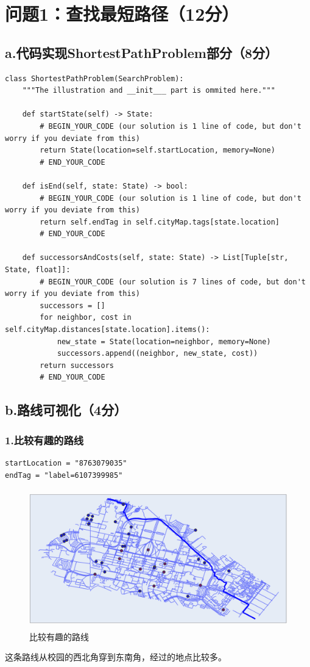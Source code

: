 \documentclass{article}
\begin{document}
\section*{问题1：查找最短路径（12分）}
\subsection*{a.代码实现ShortestPathProblem部分（8分）}
\begin{lstlisting}
class ShortestPathProblem(SearchProblem):
    """The illustration and __init___ part is ommited here."""

    def startState(self) -> State:
        # BEGIN_YOUR_CODE (our solution is 1 line of code, but don't worry if you deviate from this)
        return State(location=self.startLocation, memory=None)
        # END_YOUR_CODE

    def isEnd(self, state: State) -> bool:
        # BEGIN_YOUR_CODE (our solution is 1 line of code, but don't worry if you deviate from this)
        return self.endTag in self.cityMap.tags[state.location]
        # END_YOUR_CODE

    def successorsAndCosts(self, state: State) -> List[Tuple[str, State, float]]:
        # BEGIN_YOUR_CODE (our solution is 7 lines of code, but don't worry if you deviate from this)
        successors = []
        for neighbor, cost in self.cityMap.distances[state.location].items():
            new_state = State(location=neighbor, memory=None)
            successors.append((neighbor, new_state, cost))
        return successors
        # END_YOUR_CODE
\end{lstlisting}

\subsection*{b.路线可视化（4分）}
\subsubsection*{1.比较有趣的路线}
\begin{lstlisting}
startLocation = "8763079035"
endTag = "label=6107399985"
\end{lstlisting}
\begin{figure}[H]
	\centering 
	\includegraphics[height=6cm,width=14cm]{1.png}
    \caption{比较有趣的路线}
\end{figure}
这条路线从校园的西北角穿到东南角，经过的地点比较多。
\end{document}
